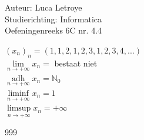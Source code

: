 \documentclass[a4paper]{article}
\begin{document}
  
\noindent \large Auteur: Luca Letroye \\
\noindent \large Studierichting: Informatica\\
\noindent \large Oefeningenreeks 6C nr. 4.4\\

\medskip


\normalsize

$(x_n)_n = (1,1,2,1,2,3,1,2,3,4,...)$\\

$\lim\limits_{n \rightarrow +\infty} x_n = $ bestaat niet\\

$\operatorname*{adh}\limits_{n \rightarrow +\infty} x_n = \mathbb{N}_0$\\

$\liminf\limits_{n \rightarrow +\infty} x_n = 1$\\

$\limsup\limits_{n \rightarrow +\infty} x_n = +\infty$



\begin{thebibliography}{999}
\end{thebibliography}
\end{document}
